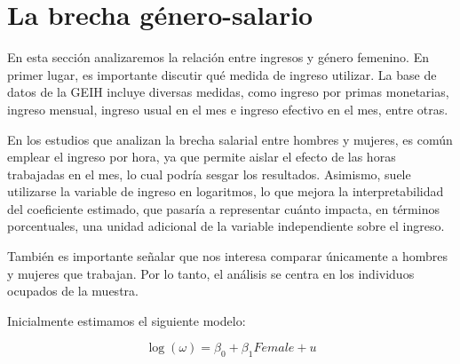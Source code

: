 \documentclass[12pt,a4paper,onecolumn]{article}
\begin{document}
\section{ La brecha género-salario}

En esta sección analizaremos la relación entre ingresos y género femenino. 
En primer lugar, es importante discutir qué medida de ingreso utilizar. 
La base de datos de la GEIH incluye diversas medidas, como ingreso por primas monetarias, ingreso mensual, ingreso usual en el mes e ingreso efectivo en el mes, entre otras. 

En los estudios que analizan la brecha salarial entre hombres y mujeres, es común emplear el ingreso por hora, ya que permite aislar el efecto de las horas trabajadas en el mes, lo cual podría sesgar los resultados. 
Asimismo, suele utilizarse la variable de ingreso en logaritmos, lo que mejora la interpretabilidad del coeficiente estimado, que pasaría a representar cuánto impacta, en términos porcentuales, una unidad adicional de la variable independiente sobre el ingreso. 

También es importante señalar que nos interesa comparar únicamente a hombres y mujeres que trabajan. 
Por lo tanto, el análisis se centra en los individuos ocupados de la muestra.

Inicialmente estimamos el siguiente modelo:

\begin{equation}
\log(\omega) = \beta_0 + \beta_1 Female + u 
\label{eq_inc}
\end{equation}
\end{document}
